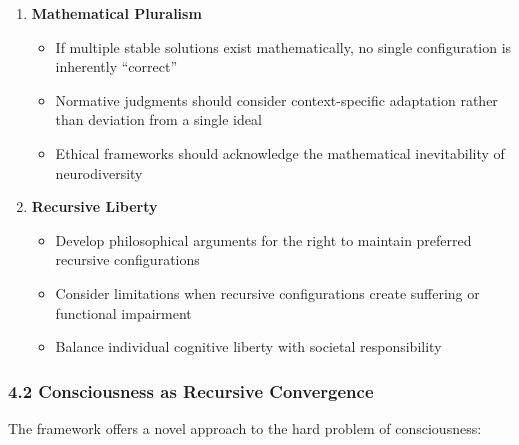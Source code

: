 \documentclass[
]{article}
\providecommand{\tightlist}{%
  \setlength{\itemsep}{0pt}\setlength{\parskip}{0pt}}
\begin{document}
\begin{enumerate}
\def\labelenumi{\arabic{enumi}.}
\tightlist
\item
  \textbf{Mathematical Pluralism}

  \begin{itemize}
  \tightlist
  \item
    If multiple stable solutions exist mathematically, no single
    configuration is inherently ``correct''
  \item
    Normative judgments should consider context-specific adaptation
    rather than deviation from a single ideal
  \item
    Ethical frameworks should acknowledge the mathematical inevitability
    of neurodiversity
  \end{itemize}
\item
  \textbf{Recursive Liberty}

  \begin{itemize}
  \tightlist
  \item
    Develop philosophical arguments for the right to maintain preferred
    recursive configurations
  \item
    Consider limitations when recursive configurations create suffering
    or functional impairment
  \item
    Balance individual cognitive liberty with societal responsibility
  \end{itemize}
\end{enumerate}

\subsubsection{4.2 Consciousness as Recursive
Convergence}\label{consciousness-as-recursive-convergence}

The framework offers a novel approach to the hard problem of
consciousness:
\end{document}
